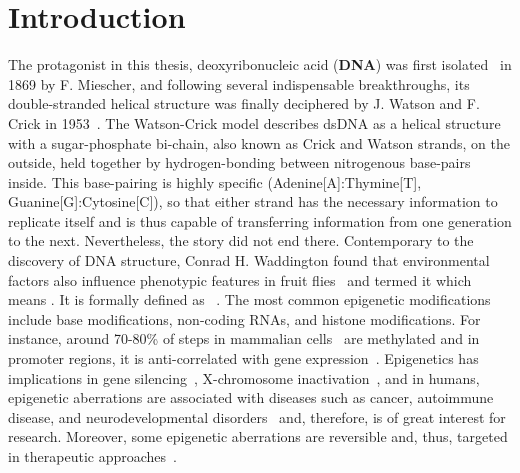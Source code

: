 \chapter{Introduction}\label{c1}
The protagonist in this thesis, deoxyribonucleic acid (\textbf{DNA}) was first isolated~\cite{nuclein} in 1869 by F. Miescher, and following several indispensable breakthroughs, its double-stranded helical structure was finally deciphered by J. Watson and F. Crick in 1953~\cite{dnastruc}.
The Watson-Crick model describes dsDNA as a helical structure with a sugar-phosphate bi-chain, also known as Crick and Watson strands, on the outside, held together by hydrogen-bonding between nitrogenous base-pairs inside.
This base-pairing is highly specific (Adenine[A]:Thymine[T], Guanine[G]:Cytosine[C]), so that either strand has the necessary information to replicate itself and is thus capable of transferring information from one generation to the next.
Nevertheless, the story did not end there.
Contemporary to the discovery of DNA structure, Conrad H. Waddington found that environmental factors also influence phenotypic features in fruit flies~\cite{epigenotype} and termed it  which means .
It is formally defined as ~\cite{berger2009operational}.
The most common epigenetic modifications include base modifications, non-coding RNAs, and histone modifications.  
For instance, around 70-80\% of \cpg steps in mammalian cells~\cite{jabbari2004cytosine} are methylated and in promoter regions, it is anti-correlated with gene expression~\cite{cedar2009linking,pennings2005dna}.
Epigenetics has implications in gene silencing~\cite{kass1997does,cedar2009linking,pennings2005dna}, X-chromosome inactivation~\cite{goto1998regulation}, and in humans, epigenetic aberrations are associated with diseases such as cancer, autoimmune disease, and neurodevelopmental disorders~\cite{portela2010epigenetic,kulis2010dna} and, therefore, is of great interest for research.
Moreover, some epigenetic aberrations are reversible and, thus, targeted in therapeutic approaches~\cite{kelly2010epigenetic}.

